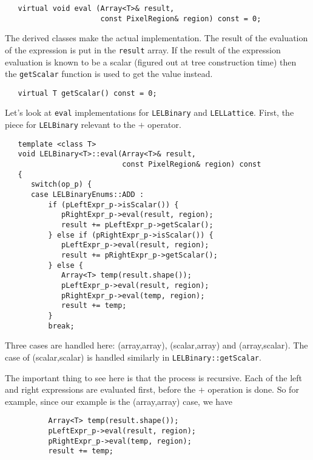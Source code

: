 \begin{verbatim}
   virtual void eval (Array<T>& result,
                      const PixelRegion& region) const = 0;
\end{verbatim}

The derived classes make the actual implementation.  The result of the
evaluation of the expression is put in the {\tt result} array.  If the
result of the expression evaluation is known to be a scalar (figured out
at tree construction time) then the {\tt getScalar} function is used to get
the value instead. 
 

\begin{verbatim}
   virtual T getScalar() const = 0;
\end{verbatim}


Let's look at {\tt eval} implementations for {\tt LELBinary} and
{\tt LELLattice}.  First, the piece for {\tt LELBinary} relevant to
the $+$ operator.

\begin{verbatim}
   template <class T>
   void LELBinary<T>::eval(Array<T>& result,
                           const PixelRegion& region) const
   {
      switch(op_p) {
      case LELBinaryEnums::ADD :
          if (pLeftExpr_p->isScalar()) {
             pRightExpr_p->eval(result, region);
             result += pLeftExpr_p->getScalar();
          } else if (pRightExpr_p->isScalar()) {
             pLeftExpr_p->eval(result, region);
             result += pRightExpr_p->getScalar();
          } else {
             Array<T> temp(result.shape());
             pLeftExpr_p->eval(result, region);
             pRightExpr_p->eval(temp, region);
             result += temp;
          }
          break;
\end{verbatim}

Three cases are handled here: (array,array), (scalar,array) and
(array,scalar).  The case of (scalar,scalar) is handled similarly in
{\tt LELBinary::getScalar}.

The important thing to see here is that the process is recursive.  Each
of the left and right expressions are evaluated first, before the $+$
operation is done.  So for example, since our example is the
(array,array) case, we have

\begin{verbatim}
          Array<T> temp(result.shape());
          pLeftExpr_p->eval(result, region);
          pRightExpr_p->eval(temp, region);
          result += temp;
\end{verbatim}


